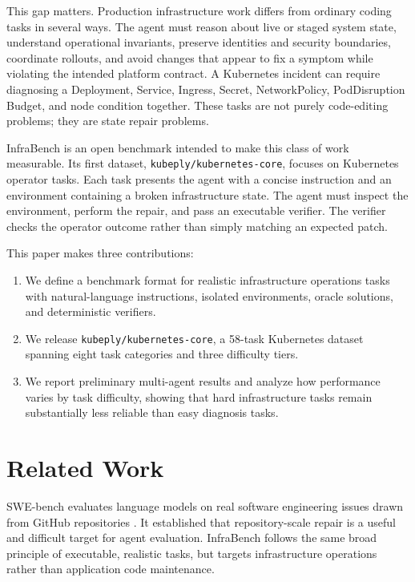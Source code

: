 \documentclass[11pt]{article}
\begin{document}
This gap matters. Production infrastructure work differs from ordinary coding
tasks in several ways. The agent must reason about live or staged system state,
understand operational invariants, preserve identities and security boundaries,
coordinate rollouts, and avoid changes that appear to fix a symptom while
violating the intended platform contract. A Kubernetes incident can require
diagnosing a Deployment, Service, Ingress, Secret, NetworkPolicy, PodDisruption
Budget, and node condition together. These tasks are not purely code-editing
problems; they are state repair problems.

InfraBench is an open benchmark intended to make this class of work measurable.
Its first dataset, \texttt{kubeply/kubernetes-core}, focuses on Kubernetes
operator tasks. Each task presents the agent with a concise instruction and an
environment containing a broken infrastructure state. The agent must inspect
the environment, perform the repair, and pass an executable verifier. The
verifier checks the operator outcome rather than simply matching an expected
patch.

This paper makes three contributions:

\begin{enumerate}
  \item We define a benchmark format for realistic infrastructure operations
  tasks with natural-language instructions, isolated environments, oracle
  solutions, and deterministic verifiers.
  \item We release \texttt{kubeply/kubernetes-core}, a 58-task Kubernetes
  dataset spanning eight task categories and three difficulty tiers.
  \item We report preliminary multi-agent results and analyze how performance
  varies by task difficulty, showing that hard infrastructure tasks remain
  substantially less reliable than easy diagnosis tasks.
\end{enumerate}

\section{Related Work}

SWE-bench evaluates language models on real software engineering issues drawn
from GitHub repositories \cite{jimenez2024swebench}. It established that
repository-scale repair is a useful and difficult target for agent evaluation.
InfraBench follows the same broad principle of executable, realistic tasks, but
targets infrastructure operations rather than application code maintenance.
\end{document}
